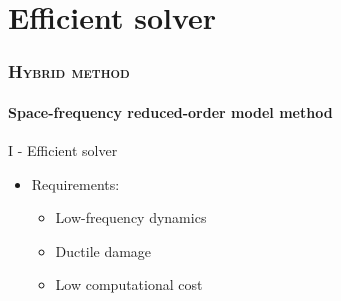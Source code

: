 \documentclass[aspectratio=1610]{beamer}
\begin{document}
	\section{Efficient solver}
	
	\begin{frame}
		\frametitle{\textsc{Hybrid method}}
		\framesubtitle{Space-frequency reduced-order model method}
		\begin{center}
			{\Huge \textcolor{BleuLMPS}{I - Efficient solver}}\\[20PT]
			\begin{minipage}{0.4\linewidth}
				\begin{itemize}
					\item[\textcolor{BleuLMPS!80}{\faMapSigns}] \textcolor{BleuLMPS!80}{Requirements:} 				
					\begin{itemize}
						\item \textcolor{BleuLMPS!60}{Low-frequency dynamics}
						\item \textcolor{BleuLMPS!60}{Ductile damage}
						\item \textcolor{BleuLMPS!60}{Low computational cost}
					\end{itemize}
				\end{itemize}
			\end{minipage}
		\end{center}
	\end{frame}
	
	
\end{document}
